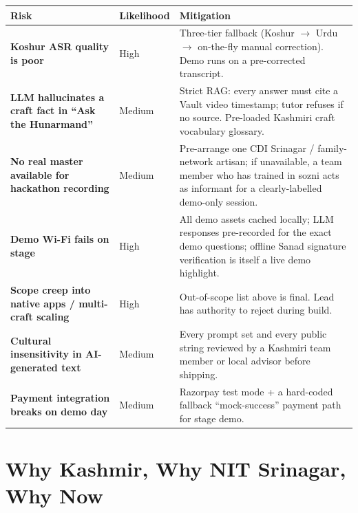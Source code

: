\documentclass[11pt, a4paper]{article}
\begin{document}
\begin{center}
\small
\begin{tabularx}{\linewidth}{>{\bfseries}lXX}
\toprule
Risk & Likelihood & Mitigation \\
\midrule
Koshur ASR quality is poor & High & Three-tier fallback (Koshur $\to$ Urdu $\to$ on-the-fly manual correction). Demo runs on a pre-corrected transcript. \\
LLM hallucinates a craft fact in ``Ask the Hunarmand'' & Medium & Strict RAG: every answer must cite a Vault video timestamp; tutor refuses if no source. Pre-loaded Kashmiri craft vocabulary glossary. \\
No real master available for hackathon recording & Medium & Pre-arrange one CDI Srinagar / family-network artisan; if unavailable, a team member who has trained in sozni acts as informant for a clearly-labelled demo-only session. \\
Demo Wi-Fi fails on stage & High & All demo assets cached locally; LLM responses pre-recorded for the exact demo questions; offline Sanad signature verification is itself a live demo highlight. \\
Scope creep into native apps / multi-craft scaling & High & Out-of-scope list above is final. Lead has authority to reject during build. \\
Cultural insensitivity in AI-generated text & Medium & Every prompt set and every public string reviewed by a Kashmiri team member or local advisor before shipping. \\
Payment integration breaks on demo day & Medium & Razorpay test mode + a hard-coded fallback ``mock-success'' payment path for stage demo. \\
\bottomrule
\end{tabularx}
\end{center}

\section{Why Kashmir, Why NIT Srinagar, Why Now}
\end{document}
